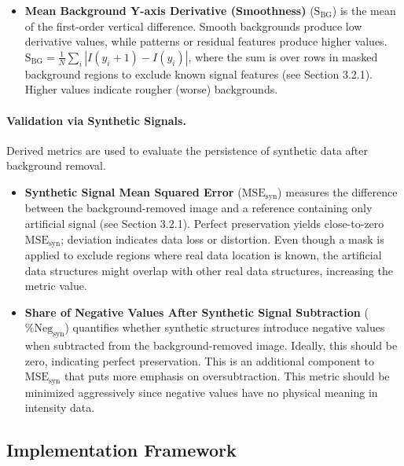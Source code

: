 \documentclass[iucr,review]{iucrjournals}
\begin{document}
\begin{itemize}
        \item \textbf{Mean Background Y-axis Derivative (Smoothness)} ($\mathrm{S}_{\mathrm{BG}}$)
        is the mean of the first-order vertical difference.
        Smooth backgrounds produce low derivative values,
        while patterns or residual features produce higher values.
        $\mathrm{S}_{\mathrm{BG}} = \frac{1}{N} \sum_i | I(y_i + 1) - I(y_i)|$,
        where the sum is over rows in masked background regions to exclude known signal features (see Section 3.2.1).
        Higher values indicate rougher (worse) backgrounds.
\end{itemize}

\paragraph{Validation via Synthetic Signals.} Derived
metrics are used to evaluate the persistence of synthetic data after background removal.
\begin{itemize}
        \item \textbf{Synthetic Signal Mean Squared Error}
        ($\mathrm{MSE}_{\mathrm{syn}}$)
        measures the
        difference between the background-removed image
        and a reference containing only artificial signal (see Section 3.2.1).
        Perfect preservation yields close-to-zero $\mathrm{MSE}_{\mathrm{syn}}$;
        deviation indicates data loss or distortion. Even though a mask is
        applied to exclude regions where real data location is known,
        the artificial data structures might overlap with other real data
        structures, increasing the metric value.
        \item \textbf{Share of Negative Values After Synthetic Signal Subtraction} ($\%\mathrm{Neg}_{\mathrm{syn}}$) quantifies whether
        synthetic structures
        introduce negative values when subtracted from the background-removed image.
        Ideally, this should be zero, indicating perfect preservation.
        This is an additional component to $\mathrm{MSE}_{\mathrm{syn}}$ that
        puts more emphasis on oversubtraction. This metric should be minimized aggressively since
        negative values have no physical meaning in intensity data.
\end{itemize}

\subsection{Implementation Framework}
\end{document}
